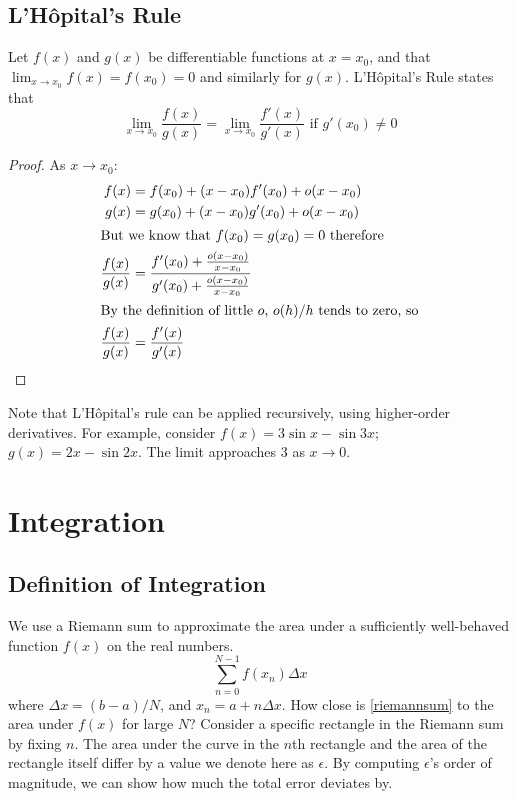 \documentclass{article}
\begin{document}
\subsection{L'H\^opital's Rule}
Let $f(x)$ and $g(x)$ be differentiable functions at $x=x_0$, and that $\lim_{x\to x_0} f(x) = f(x_0) = 0$ and similarly for $g(x)$. L'H\^opital's Rule states that
\[ \lim_{x\to x_0} \frac{f(x)}{g(x)} = \lim_{x\to x_0} \frac{f'(x)}{g'(x)} \text{ if } g'(x_0) \neq 0 \]
\begin{proof}
	As $x \to x_0$:
	\begin{align*}
		f(x)              & = f(x_0) + (x-x_0) f'(x_0) + o(x-x_0)                                       \\
		g(x)              & = g(x_0) + (x-x_0) g'(x_0) + o(x-x_0)                                       \\
		\intertext{But we know that $f(x_0)=g(x_0)=0$ therefore}
		\frac{f(x)}{g(x)} & = \frac{f'(x_0) + \frac{o(x-x_0)}{x-x_0}}{g'(x_0) + \frac{o(x-x_0)}{x-x_0}} \\
		\intertext{By the definition of little $o$, $o(h)/h$ tends to zero, so}
		\frac{f(x)}{g(x)} & = \frac{f'(x)}{g'(x)}
	\end{align*}
\end{proof}
Note that L'H\^opital's rule can be applied recursively, using higher-order derivatives. For example, consider $f(x) = 3\sin x - \sin 3x$; $g(x) = 2x - \sin 2x$. The limit approaches 3 as $x \to 0$.

\section{Integration}
\subsection{Definition of Integration}
We use a Riemann sum to approximate the area under a sufficiently well-behaved function $f(x)$ on the real numbers.
\begin{equation}\label{riemannsum}
	\sum_{n=0}^{N-1} f(x_n) \Delta x
\end{equation}
where $\Delta x = (b-a)/N$, and $x_n = a + n\Delta x$. How close is \eqref{riemannsum} to the area under $f(x)$ for large $N$? Consider a specific rectangle in the Riemann sum by fixing $n$. The area under the curve in the $n$th rectangle and the area of the rectangle itself differ by a value we denote here as $\epsilon$. By computing $\epsilon$'s order of magnitude, we can show how much the total error deviates by.
\end{document}
